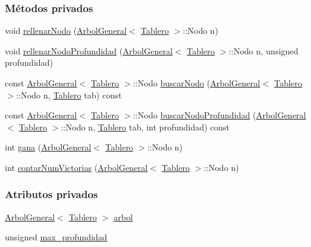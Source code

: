 \subsubsection*{Métodos privados}
\begin{DoxyCompactItemize}
\item 
void \hyperlink{classJugadorAuto_ae90fa3f90f9f0357a1e04512e1352f80}{rellenar\-Nodo} (\hyperlink{classArbolGeneral}{Arbol\-General}$<$ \hyperlink{classTablero}{Tablero} $>$\-::Nodo n)
\item 
void \hyperlink{classJugadorAuto_add87179bcda9c297dfe06ca327a3de84}{rellenar\-Nodo\-Profundidad} (\hyperlink{classArbolGeneral}{Arbol\-General}$<$ \hyperlink{classTablero}{Tablero} $>$\-::Nodo n, unsigned profundidad)
\item 
const \hyperlink{classArbolGeneral}{Arbol\-General}$<$ \hyperlink{classTablero}{Tablero} $>$\-::Nodo \hyperlink{classJugadorAuto_ace20f5c31c291f99491df06b356ae37d}{buscar\-Nodo} (\hyperlink{classArbolGeneral}{Arbol\-General}$<$ \hyperlink{classTablero}{Tablero} $>$\-::Nodo n, \hyperlink{classTablero}{Tablero} tab) const 
\item 
const \hyperlink{classArbolGeneral}{Arbol\-General}$<$ \hyperlink{classTablero}{Tablero} $>$\-::Nodo \hyperlink{classJugadorAuto_aeeda871eb999ffc3e9d4a87cdcc01e7d}{buscar\-Nodo\-Profundidad} (\hyperlink{classArbolGeneral}{Arbol\-General}$<$ \hyperlink{classTablero}{Tablero} $>$\-::Nodo n, \hyperlink{classTablero}{Tablero} tab, int profundidad) const 
\item 
int \hyperlink{classJugadorAuto_ac549b60abbbae7245321cf7436382de6}{gana} (\hyperlink{classArbolGeneral}{Arbol\-General}$<$ \hyperlink{classTablero}{Tablero} $>$\-::Nodo n)
\item 
int \hyperlink{classJugadorAuto_a79ebbd4001280b8d81f1bdb8376214e5}{contar\-Num\-Victorias} (\hyperlink{classArbolGeneral}{Arbol\-General}$<$ \hyperlink{classTablero}{Tablero} $>$\-::Nodo n)
\end{DoxyCompactItemize}
\subsubsection*{Atributos privados}
\begin{DoxyCompactItemize}
\item 
\hyperlink{classArbolGeneral}{Arbol\-General}$<$ \hyperlink{classTablero}{Tablero} $>$ \hyperlink{classJugadorAuto_a0ceb9994f364572f00abf5c490b50319}{arbol}
\item 
unsigned \hyperlink{classJugadorAuto_a442a2ba01ebcc71283833176e214b7d3}{max\-\_\-profundidad}
\end{DoxyCompactItemize}


